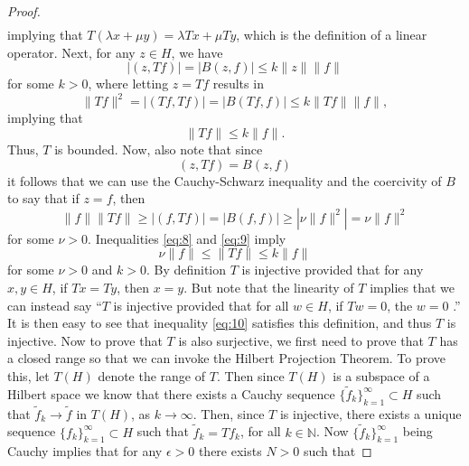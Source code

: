 \documentclass[11pt]{article}
\theoremstyle{definition}
\begin{document}
\begin{proof}
\begin{equation*}
\begin{aligned}
		\end{aligned}
	\end{equation*}
	implying that $T(\lambda x + \mu y) = \lambda Tx + \mu Ty$, which is the definition of a linear operator.
	Next, for any $z \in H$, we have
	\begin{equation*}
		|(z,Tf)| = |B(z,f)| \leq k\|z\|\|f\|
	\end{equation*}
	for some $k>0$, where letting $z = Tf$ results in
	\begin{equation*}
		\|Tf\|^2 = |(Tf,Tf)| = |B(Tf,f)| \leq k\|Tf\|\|f\|,
	\end{equation*}
	implying that
	\begin{equation}
		\label{eq:8}
		\|Tf\| \leq k\|f\|.
	\end{equation}
	Thus, $T$ is bounded. Now, also note that since
	\begin{equation*}
		(z,Tf) = B(z,f)
	\end{equation*}
	it follows that we can use the Cauchy-Schwarz inequality and the coercivity of $B$ to say that if $z=f$, then
	\begin{equation}
		\label{eq:9}
		\|f\|\|Tf\| \geq |(f,Tf)| = |B(f,f)| \geq |\nu \|f\|^2| = \nu \|f\|^2
	\end{equation}
	for some $\nu > 0$. Inequalities \ref{eq:8} and \ref{eq:9} imply
	\begin{equation}
		\label{eq:10}
		\nu \|f\| \leq \|Tf\| \leq k \|f\|
	\end{equation}
	for some $\nu >0$ and $k >0$.
	By definition $T$ is injective provided that for any $x,y \in H$, if $Tx = Ty$, then $x=y$.
	But note that the linearity of $T$ implies that we can instead say ``$T$ is injective provided that
	for all $w \in H$, if $Tw = 0$, the $w = 0$ .'' It is then easy to see that inequality \ref{eq:10}
	satisfies this definition, and thus $T$ is injective.
	Now to prove that $T$ is also surjective, we first need to prove that $T$ has a closed range so that
	we can invoke the Hilbert Projection Theorem. To prove this, let $T(H)$ denote the range of $T$.
	Then since $T(H)$ is a subspace of a Hilbert space we know that there exists a Cauchy sequence $\{\tilde{f}_k\}_{k=1}^{\infty} \subset H$
	such that $\tilde{f}_k \rightarrow \tilde{f}$ in $T(H)$, as $k\rightarrow \infty$. Then, since $T$ is injective, there exists a unique
	sequence $\{f_k\}_{k=1}^{\infty} \subset H$ such that $\tilde{f}_k = Tf_k$, for all $k \in \mathbb{N}$. Now $\{\tilde{f}_k\}_{k=1}^{\infty}$
	being Cauchy implies that for any $\epsilon > 0$ there exists $N >0$ such that

\end{proof}
\end{document}
